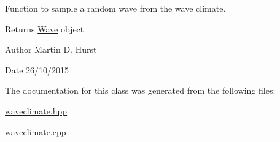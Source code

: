 Function to sample a random wave from the wave climate. 

\begin{DoxyReturn}{Returns}
\hyperlink{classWave}{Wave} object 
\end{DoxyReturn}
\begin{DoxyAuthor}{Author}
Martin D. Hurst 
\end{DoxyAuthor}
\begin{DoxyDate}{Date}
26/10/2015 
\end{DoxyDate}


The documentation for this class was generated from the following files\-:\begin{DoxyCompactItemize}
\item 
\hyperlink{waveclimate_8hpp}{waveclimate.\-hpp}\item 
\hyperlink{waveclimate_8cpp}{waveclimate.\-cpp}\end{DoxyCompactItemize}
